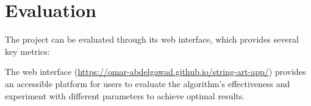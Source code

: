 \documentclass[11pt]{article}
\begin{document}
\section{Evaluation}

The project can be evaluated through its web interface, which provides several key metrics:


The web interface (\url{https://omar-abdelgawad.github.io/string-art-app/}) provides an accessible platform for users to evaluate the algorithm's effectiveness and experiment with different parameters to achieve optimal results.
\end{document}
